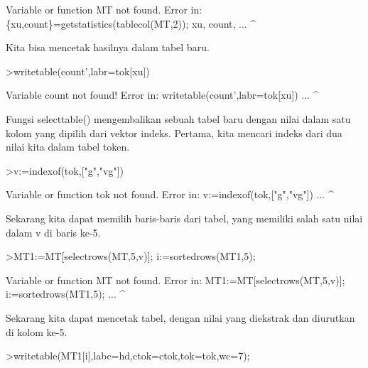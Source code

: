 \documentclass[a4paper,10pt]{article}
\begin{document}
\begin{eulernotebook}
\begin{eulerprompt}
\end{eulerprompt}
\begin{euleroutput}
  Variable or function MT not found.
  Error in:
  \{xu,count\}=getstatistics(tablecol(MT,2)); xu, count, ...
                                      ^
\end{euleroutput}
\begin{eulercomment}
Kita bisa mencetak hasilnya dalam tabel baru.
\end{eulercomment}
\begin{eulerprompt}
>writetable(count',labr=tok[xu])
\end{eulerprompt}
\begin{euleroutput}
  Variable count not found!
  Error in:
  writetable(count',labr=tok[xu]) ...
                   ^
\end{euleroutput}
\begin{eulercomment}
Fungsi selecttable() mengembalikan sebuah tabel baru dengan nilai
dalam satu kolom yang dipilih dari vektor indeks. Pertama, kita
mencari indeks dari dua nilai kita dalam tabel token.
\end{eulercomment}
\begin{eulerprompt}
>v:=indexof(tok,["g","vg"])
\end{eulerprompt}
\begin{euleroutput}
  Variable or function tok not found.
  Error in:
  v:=indexof(tok,["g","vg"]) ...
                ^
\end{euleroutput}
\begin{eulercomment}
Sekarang kita dapat memilih baris-baris dari tabel, yang memiliki
salah satu nilai dalam v di baris ke-5.
\end{eulercomment}
\begin{eulerprompt}
>MT1:=MT[selectrows(MT,5,v)]; i:=sortedrows(MT1,5);
\end{eulerprompt}
\begin{euleroutput}
  Variable or function MT not found.
  Error in:
  MT1:=MT[selectrows(MT,5,v)]; i:=sortedrows(MT1,5); ...
                       ^
\end{euleroutput}
\begin{eulercomment}
Sekarang kita dapat mencetak tabel, dengan nilai yang diekstrak dan
diurutkan di kolom ke-5.
\end{eulercomment}
\begin{eulerprompt}
>writetable(MT1[i],labc=hd,ctok=ctok,tok=tok,wc=7);
\end{eulerprompt}
\begin{euleroutput}

\end{euleroutput}
\end{eulernotebook}
\end{document}
